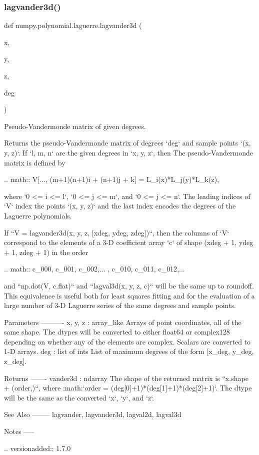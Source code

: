 \subsubsection{\texorpdfstring{lagvander3d()}{lagvander3d()}}
{\footnotesize\ttfamily def numpy.\+polynomial.\+laguerre.\+lagvander3d (\begin{DoxyParamCaption}\item[{}]{x,  }\item[{}]{y,  }\item[{}]{z,  }\item[{}]{deg }\end{DoxyParamCaption})}

\begin{DoxyVerb}Pseudo-Vandermonde matrix of given degrees.

Returns the pseudo-Vandermonde matrix of degrees `deg` and sample
points `(x, y, z)`. If `l, m, n` are the given degrees in `x, y, z`,
then The pseudo-Vandermonde matrix is defined by

.. math:: V[..., (m+1)(n+1)i + (n+1)j + k] = L_i(x)*L_j(y)*L_k(z),

where `0 <= i <= l`, `0 <= j <= m`, and `0 <= j <= n`.  The leading
indices of `V` index the points `(x, y, z)` and the last index encodes
the degrees of the Laguerre polynomials.

If ``V = lagvander3d(x, y, z, [xdeg, ydeg, zdeg])``, then the columns
of `V` correspond to the elements of a 3-D coefficient array `c` of
shape (xdeg + 1, ydeg + 1, zdeg + 1) in the order

.. math:: c_{000}, c_{001}, c_{002},... , c_{010}, c_{011}, c_{012},...

and  ``np.dot(V, c.flat)`` and ``lagval3d(x, y, z, c)`` will be the
same up to roundoff. This equivalence is useful both for least squares
fitting and for the evaluation of a large number of 3-D Laguerre
series of the same degrees and sample points.

Parameters
----------
x, y, z : array_like
    Arrays of point coordinates, all of the same shape. The dtypes will
    be converted to either float64 or complex128 depending on whether
    any of the elements are complex. Scalars are converted to 1-D
    arrays.
deg : list of ints
    List of maximum degrees of the form [x_deg, y_deg, z_deg].

Returns
-------
vander3d : ndarray
    The shape of the returned matrix is ``x.shape + (order,)``, where
    :math:`order = (deg[0]+1)*(deg[1]+1)*(deg[2]+1)`.  The dtype will
    be the same as the converted `x`, `y`, and `z`.

See Also
--------
lagvander, lagvander3d, lagval2d, lagval3d

Notes
-----

.. versionadded:: 1.7.0\end{DoxyVerb}
 \mbox{\label{namespacenumpy_1_1polynomial_1_1laguerre_adbd0efc350111d55b6070e0c2e8b3c14}} 
